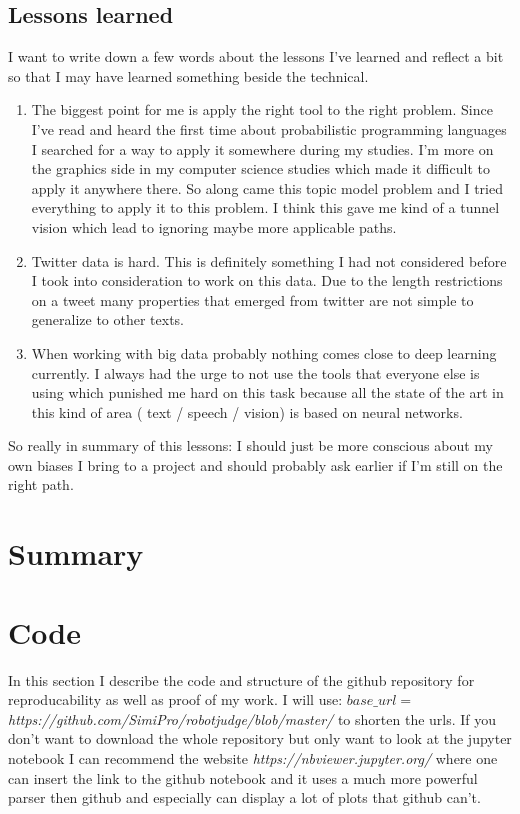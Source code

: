 \documentclass[10pt,conference,compsocconf]{IEEEtran}
\begin{document}
\subsection{Lessons learned}
I want to write down a few words about the lessons I've learned and reflect a bit so that I may have learned something beside the technical. 
\begin{enumerate}
	\item The biggest point for me is apply the right tool to the right problem. Since I've read and heard the first time about probabilistic programming languages I searched for a way to apply it somewhere during my studies. I'm more on the graphics side in my computer science studies which made it difficult to apply it anywhere there. So along came this topic model problem and I tried everything to apply it to this problem. I think this gave me kind of a tunnel vision which lead to ignoring maybe more applicable paths.
	\item Twitter data is hard. This is definitely something I had not considered before I took into consideration to work on this data. Due to the length restrictions on a tweet many properties that emerged from twitter are not simple to generalize to other texts. 
	\item When working with big data probably nothing comes close to deep learning currently. I always had the urge to not use the tools that everyone else is using which punished me hard on this task because all the state of the art in this kind of area ( text / speech / vision) is based on neural networks. 
\end{enumerate}
So really in summary of this lessons: I should just be more conscious about my own biases I bring to a project and should probably ask earlier if I'm still on the right path. 


\section{Summary}
\label{sec:Summary}

\section{Code}
\label{sec:Code}
In this section I describe the code and structure of the github repository for reproducability as well as proof of my work. I will use: $base\_url =$ \textit{https://github.com/SimiPro/robotjudge/blob/master/} to shorten the urls. If you don't want to download the whole repository but only want to look at the jupyter notebook I can recommend the website \textit{https://nbviewer.jupyter.org/} where one can insert the link to the github notebook and it uses a much more powerful parser then github and especially can display a lot of plots that github can't.
\end{document}
